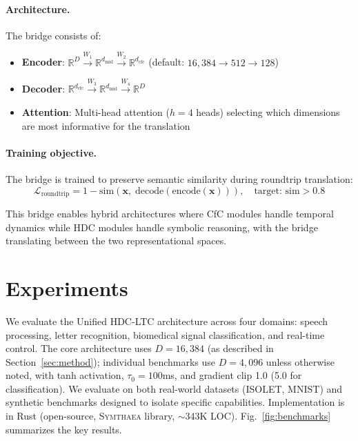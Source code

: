 \documentclass{article}
\newcommand{\R}{\mathbb{R}}
\newcommand{\hvx}{\mathbf{x}}
\newcommand{\symthaea}{\textsc{Symthaea}}
\begin{document}
\paragraph{Architecture.} The bridge consists of:
\begin{itemize}
    \item \textbf{Encoder}: $\R^D \xrightarrow{W_1} \R^{d_\text{mid}} \xrightarrow{W_2} \R^{d_\text{cfc}}$ (default: $16{,}384 \to 512 \to 128$)
    \item \textbf{Decoder}: $\R^{d_\text{cfc}} \xrightarrow{W_3} \R^{d_\text{mid}} \xrightarrow{W_4} \R^D$
    \item \textbf{Attention}: Multi-head attention ($h{=}4$ heads) selecting which dimensions are most informative for the translation
\end{itemize}

\paragraph{Training objective.} The bridge is trained to preserve semantic similarity during roundtrip translation:
\begin{equation}
    \mathcal{L}_\text{roundtrip} = 1 - \text{sim}\!\left(\hvx, \; \text{decode}(\text{encode}(\hvx))\right), \quad \text{target: sim} > 0.8
\end{equation}

This bridge enables hybrid architectures where CfC modules handle temporal dynamics while HDC modules handle symbolic reasoning, with the bridge translating between the two representational spaces.

\section{Experiments}
\label{sec:experiments}

We evaluate the Unified HDC-LTC architecture across four domains: speech processing, letter recognition, biomedical signal classification, and real-time control. The core architecture uses $D = 16{,}384$ (as described in Section~\ref{sec:method}); individual benchmarks use $D = 4{,}096$ unless otherwise noted, with tanh activation, $\tau_0 = 100$ms, and gradient clip 1.0 (5.0 for classification). We evaluate on both real-world datasets (ISOLET, MNIST) and synthetic benchmarks designed to isolate specific capabilities. Implementation is in Rust (open-source, \symthaea{} library, $\sim$343K LOC). Fig.~\ref{fig:benchmarks} summarizes the key results.
\end{document}
